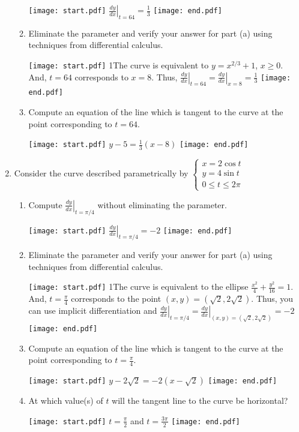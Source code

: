 \documentclass[12pt]{article}
\begin{document}
\begin{enumerate}
\begin{enumerate}
\texttt{[image: start.pdf]}
{{$\left.\frac{dy}{dx}\right|_{t=64}=\frac{1}{3}$}}
\texttt{[image: end.pdf]}


\item Eliminate the parameter and verify your answer for part (a) using techniques from differential calculus.

\texttt{[image: start.pdf]}
{{{1\linewidth}{The curve is equivalent to $y=x^{2/3}+1$, $x \geq 0$.  And, $t=64$ corresponds to $x=8$.  Thus, $\left.\frac{dy}{dx}\right|_{t=64}=\left.\frac{dy}{dx}\right|_{x=8}=\frac{1}{3}$}}}
\texttt{[image: end.pdf]}


\item Compute an equation of the line which is tangent to the curve at the point corresponding to $t=64$.

\texttt{[image: start.pdf]}
{{$y-5=\frac{1}{3}(x-8)$}}
\texttt{[image: end.pdf]}


\end{enumerate}

\newpage

\item Consider the curve described parametrically by $\left\{\begin{array}{l}
x=2\cos{t}\\
y=4\sin{t}\\
0 \leq t \leq 2\pi \end{array}\right.$

\begin{enumerate}

\item Compute $\left.\frac{dy}{dx}\right|_{t=\pi/4}$ without eliminating the parameter.

\texttt{[image: start.pdf]}
{{$\left.\frac{dy}{dx}\right|_{t=\pi/4}=-2$}}
\texttt{[image: end.pdf]}


\item Eliminate the parameter and verify your answer for part (a) using techniques from differential calculus.

\texttt{[image: start.pdf]}
{{{1\linewidth}{The curve is equivalent to the ellipse $\frac{x^2}{4}+\frac{y^2}{16}=1$.  And, $t=\frac{\pi}{4}$ corresponds to the point $(x,y)=(\sqrt{2},2\sqrt{2})$.  Thus, you can use implicit differentiation and $\left.\frac{dy}{dx}\right|_{t=\pi/4}=\left.\frac{dy}{dx}\right|_{(x,y)=\left(\sqrt{2},2\sqrt{2}\right)}=-2$}}}
\texttt{[image: end.pdf]}


\item Compute an equation of the line which is tangent to the curve at the point corresponding to $t=\frac{\pi}{4}$.

\texttt{[image: start.pdf]}
{{$y-2\sqrt{2}=-2\left(x-\sqrt{2}\right)$}}
\texttt{[image: end.pdf]}


\item At which value(s) of $t$ will the tangent line to the curve be horizontal?

\texttt{[image: start.pdf]}
{{$t=\frac{\pi}{2}$ and $t=\frac{3\pi}{2}$}}
\texttt{[image: end.pdf]}


\end{enumerate}

\end{enumerate}
\end{document}
